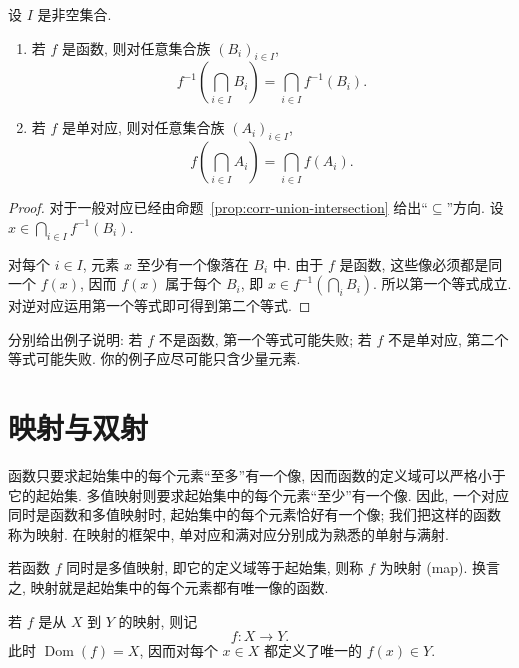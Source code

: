 \documentclass[usesamecnt, thmcnt=section, lang=cn, newtx, 10pt, scheme=chinese]{elegantbook}
\begin{document}
\begin{proposition}\label{prop:corr-intersection-uniqueness}
设 $I$ 是非空集合.
\begin{enumerate}[label=\rm(\arabic*)]
  \item 若 $f$ 是函数, 则对任意集合族 $(B_i)_{i\in I}$,
  \[
   f^{-1}\left(\bigcap_{i\in I}B_i\right)
   =\bigcap_{i\in I}f^{-1}(B_i).
  \]
  \item 若 $f$ 是单对应, 则对任意集合族 $(A_i)_{i\in I}$,
  \[
   f\left(\bigcap_{i\in I}A_i\right)
   =\bigcap_{i\in I}f(A_i).
  \]
\end{enumerate}
\end{proposition}

\begin{proof}
对于一般对应已经由命题~\ref{prop:corr-union-intersection} 给出``$\subseteq$''方向. 设 $x\in\bigcap_{i\in I}f^{-1}(B_i)$. 

对每个 $i\in I$, 元素 $x$ 至少有一个像落在 $B_i$ 中. 由于 $f$ 是函数, 这些像必须都是同一个 $f(x)$, 因而 $f(x)$ 属于每个 $B_i$, 即 $x\in f^{-1}(\bigcap_iB_i)$. 所以第一个等式成立. 对逆对应运用第一个等式即可得到第二个等式.
\end{proof}

\begin{exercise}\label{ex:corr-intersection-uniqueness}
分别给出例子说明: 若 $f$ 不是函数, 第一个等式可能失败; 若 $f$ 不是单对应, 第二个等式可能失败. 你的例子应尽可能只含少量元素.
\end{exercise}

\section{映射与双射}

函数只要求起始集中的每个元素``至多''有一个像, 因而函数的定义域可以严格小于它的起始集. 多值映射则要求起始集中的每个元素``至少''有一个像. 因此, 一个对应同时是函数和多值映射时, 起始集中的每个元素恰好有一个像; 我们把这样的函数称为映射. 在映射的框架中, 单对应和满对应分别成为熟悉的单射与满射.

\begin{definition}[映射]\label{def:corr-mapping}
若函数 $f$ 同时是多值映射, 即它的定义域等于起始集, 则称 $f$ 为{\color{blue}映射 (map)}. 换言之, 映射就是起始集中的每个元素都有唯一像的函数.

若 $f$ 是从 $X$ 到 $Y$ 的映射, 则记
\[
 f:X\longrightarrow Y.
\]
此时 $\operatorname{Dom}(f)=X$, 因而对每个 $x\in X$ 都定义了唯一的 $f(x)\in Y$.
\end{definition}
\end{document}

